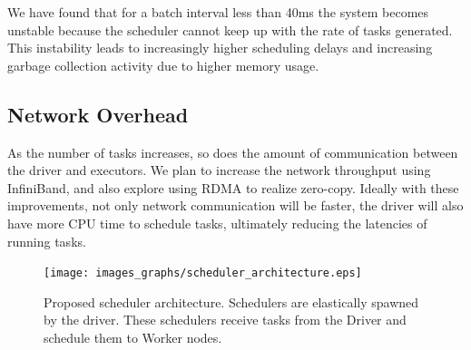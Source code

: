 We have found that for a batch interval less than 40ms the system becomes unstable because the scheduler cannot keep up with the rate of tasks generated. This instability leads to increasingly higher scheduling delays and increasing garbage collection activity due to higher memory usage. 

\subsection{Network Overhead}
As the number of tasks increases, so does the amount of communication between the driver and executors. We plan to increase the network throughput using InfiniBand, and also explore using RDMA to realize zero-copy. Ideally with these improvements, not only network communication will be faster, the driver will also have more CPU time to schedule tasks, ultimately reducing the latencies of running tasks.


\begin{figure}[t!]
  \begin{center}
    \texttt{[image: images\_graphs/scheduler\_architecture.eps]}
  \end{center}
  \caption{Proposed scheduler architecture. Schedulers are elastically spawned by the driver. These schedulers receive tasks from the Driver and schedule them to Worker nodes.}
  \label{fig:schedarch}
\end{figure}

